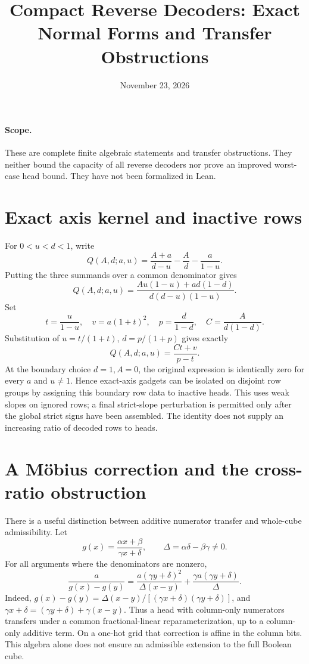 \documentclass[11pt]{article}
\title{Compact Reverse Decoders: Exact Normal Forms and Transfer Obstructions}
\author{}
\date{November 23, 2026}
\begin{document}
\maketitle

\paragraph{Scope.}
These are complete finite algebraic statements and transfer obstructions.
They neither bound the capacity of all reverse decoders nor prove an
improved worst-case head bound. They have not been formalized in Lean.

\section{Exact axis kernel and inactive rows}
For $0<u<d<1$, write
\[
 Q(A,d;a,u)=\frac{A+a}{d-u}-\frac A d-\frac a{1-u}.
\]
Putting the three summands over a common denominator gives
\[
 Q(A,d;a,u)=
 \frac{Au(1-u)+ad(1-d)}{d(d-u)(1-u)}.
\]
Set
\[
 t=\frac{u}{1-u},\quad v=a(1+t)^2,\quad
 p=\frac d{1-d},\quad C=\frac A{d(1-d)}.
\]
Substitution of $u=t/(1+t)$, $d=p/(1+p)$ gives exactly
\[
 Q(A,d;a,u)=\frac{Ct+v}{p-t}.
\]
At the boundary choice $d=1,A=0$, the original expression is identically
zero for every $a$ and $u\ne1$. Hence exact-axis gadgets can be isolated
on disjoint row groups by assigning this boundary row data to inactive
heads. This uses weak slopes on ignored rows; a final strict-slope
perturbation is permitted only after the global strict signs have been
assembled. The identity does not supply an increasing ratio of decoded
rows to heads.

\section{A Möbius correction and the cross-ratio obstruction}
There is a useful distinction between additive numerator transfer and
whole-cube admissibility. Let
\[
 g(x)=\frac{\alpha x+\beta}{\gamma x+\delta},
 \qquad \Delta=\alpha\delta-\beta\gamma\ne0.
\]
For all arguments where the denominators are nonzero,
\[
 \frac{a}{g(x)-g(y)}
 =\frac{a(\gamma y+\delta)^2}{\Delta(x-y)}
   +\frac{\gamma a(\gamma y+\delta)}{\Delta}.
\]
Indeed, $g(x)-g(y)=\Delta(x-y)/[(\gamma x+\delta)
(\gamma y+\delta)]$, and
$\gamma x+\delta=(\gamma y+\delta)+\gamma(x-y)$.
Thus a head with column-only numerators transfers under a common
fractional-linear reparameterization, up to a column-only additive term.
On a one-hot grid that correction is affine in the column bits.
This algebra alone does not ensure an admissible extension to the full
Boolean cube.
\end{document}
